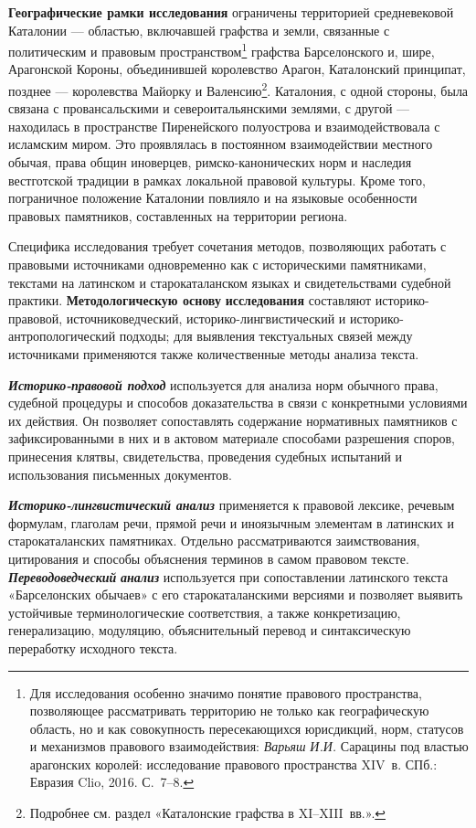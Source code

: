 \textbf{Географические рамки исследования }ограничены территорией средневековой Каталонии --- областью, включавшей графства и земли, связанные с политическим и правовым пространством\footnote{Для исследования особенно значимо понятие правового пространства, позволяющее рассматривать территорию не только как географическую область, но и как совокупность пересекающихся юрисдикций, норм, статусов и механизмов правового взаимодействия: \emph{Варьяш}\emph{ И.И.} Сарацины под властью арагонских королей: исследование правового пространства XIV~в. СПб.: Евразия Clio, 2016. С.~7--8.} графства Барселонского и, шире, Арагонской Короны, объединившей королевство Арагон, Каталонский принципат, позднее --- королевства Майорку и Валенсию\footnote{Подробнее см. раздел «Каталонские графства в XI--XIII~вв.».}. Каталония, с одной стороны, была связана с провансальскими и североитальянскими землями, с другой --- находилась в пространстве Пиренейского полуострова и взаимодействовала с исламским миром. Это проявлялась в постоянном взаимодействии местного обычая, права общин иноверцев, римско-канонических норм и наследия вестготской традиции в рамках локальной правовой культуры. Кроме того, пограничное положение Каталонии повлияло и на языковые особенности правовых памятников, составленных на территории региона.

Специфика исследования требует сочетания методов, позволяющих работать с правовыми источниками одновременно как с историческими памятниками, текстами на латинском и старокаталанском языках и свидетельствами судебной практики. \textbf{Методологическую основу }\textbf{исследования} составляют историко-правовой, источниковедческий, историко-лингвистический и историко-антропологический подходы; для выявления текстуальных связей между источниками применяются также количественные методы анализа текста.

\textbf{\emph{Историко-правовой подход }}используется для анализа норм обычного права, судебной процедуры и способов доказательства в связи с конкретными условиями их действия. Он позволяет сопоставлять содержание нормативных памятников с зафиксированными в них и в актовом материале способами разрешения споров, принесения клятвы, свидетельства, проведения судебных испытаний и использования письменных документов.

\textbf{\emph{Историко-лингвистический анализ }}применяется к правовой лексике, речевым формулам, глаголам речи, прямой речи и иноязычным элементам в латинских и старокаталанских памятниках. Отдельно рассматриваются заимствования, цитирования и способы объяснения терминов в самом правовом тексте. \textbf{\emph{Переводоведческий}}\textbf{\emph{ анализ}} используется при сопоставлении латинского текста «Барселонских обычаев» с его старокаталанскими версиями и позволяет выявить устойчивые терминологические соответствия, а также конкретизацию, генерализацию, модуляцию, объяснительный перевод и синтаксическую переработку исходного текста.

